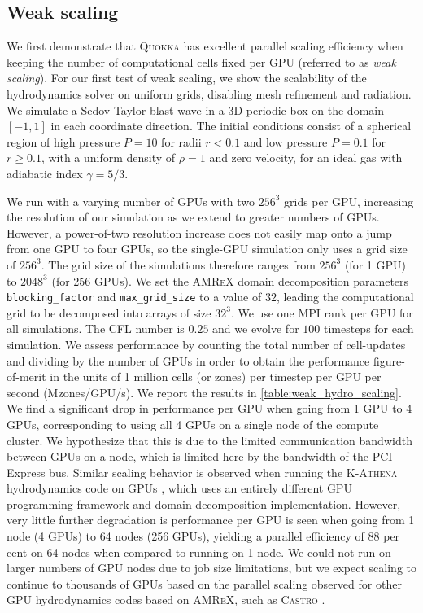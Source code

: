\documentclass[fleqn,usenatbib]{mnras}
\begin{document}
\label{section:performance}
\subsection{Weak scaling}
We first demonstrate that \textsc{Quokka} has excellent parallel scaling efficiency when keeping the number of computational cells fixed per GPU (referred to as \emph{weak scaling}). For our first test of weak scaling, we show the scalability of the hydrodynamics solver on uniform grids, disabling mesh refinement and radiation. We simulate a Sedov-Taylor blast wave \citep{Sedov_1959,Taylor_1946} in a 3D periodic box on the domain $[-1, 1]$ in each coordinate direction. The initial conditions consist of a spherical region of high pressure $P = 10$ for radii $r < 0.1$ and low pressure $P = 0.1$ for $r \ge 0.1$, with a uniform density of $\rho = 1$ and zero velocity, for an ideal gas with adiabatic index $\gamma = 5/3$.

We run with a varying number of GPUs with two $256^3$ grids per GPU, increasing the resolution of our simulation as we extend to greater numbers of GPUs. However, a power-of-two resolution increase does not easily map onto a jump from one GPU to four GPUs, so the single-GPU simulation only uses a grid size of $256^3$. The grid size of the simulations therefore ranges from $256^3$ (for 1 GPU) to $2048^3$ (for 256 GPUs). We set the \textsc{AMReX} domain decomposition parameters \texttt{blocking\_factor} and \texttt{max\_grid\_size} to a value of $32$, leading the computational grid to be decomposed into arrays of size $32^3$. We use one MPI rank per GPU for all simulations. The CFL number is $0.25$ and we evolve for $100$ timesteps for each simulation. We assess performance by counting the total number of cell-updates and dividing by the number of GPUs in order to obtain the performance figure-of-merit in the units of 1 million cells (or zones) per timestep per GPU per second (Mzones/GPU/s).  We report the results in \autoref{table:weak_hydro_scaling}. We find a significant drop in performance per GPU when going from 1 GPU to 4 GPUs, corresponding to using all 4 GPUs on a single node of the compute cluster. We hypothesize that this is due to the limited communication bandwidth between GPUs on a node, which is limited here by the bandwidth of the PCI-Express bus. Similar scaling behavior is observed when running the \textsc{K-Athena} hydrodynamics code on GPUs \citep{Grete_2019}, which uses an entirely different GPU programming framework and domain decomposition implementation. However, very little further degradation is performance per GPU is seen when going from 1 node (4 GPUs) to 64 nodes (256 GPUs), yielding a parallel efficiency of 88 per cent on 64 nodes when compared to running on 1 node.  We could not run on larger numbers of GPU nodes due to job size limitations, but we expect scaling to continue to thousands of GPUs based on the parallel scaling observed for other GPU hydrodynamics codes based on \textsc{AMReX}, such as \textsc{Castro} \citep{Almgren_2020}.
\end{document}
